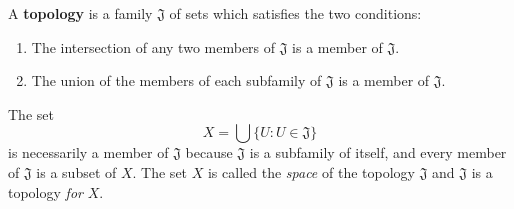 A \textbf{topology} is a family $\mathfrak{J}$ of sets which satisfies the two conditions:
\begin{enumerate}
\item The intersection of any two members of $\mathfrak{J}$ is a member of $\mathfrak{J}$.
\item The union of the members of each subfamily of $\mathfrak{J}$ is a member of $\mathfrak{J}$.
\end{enumerate}
The set 
$$X = \bigcup\{U : U \in \mathfrak{J}\}$$
is necessarily a member of $\mathfrak{J}$ because $\mathfrak{J}$ is a subfamily of itself, and every member of $\mathfrak{J}$ is a subset of $X$. The set $X$ is called the \textit{space} of the topology $\mathfrak{J}$ and $\mathfrak{J}$ is a topology \textit{for} $X$.
